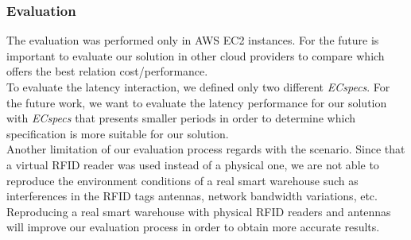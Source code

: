 \subsubsection{Evaluation}
\label{subs:conclusion_eval}
The evaluation was performed only in \gls{AWS} \gls{EC2} instances. For the future is important to
evaluate our solution in other cloud providers to compare which offers the best relation
cost/performance.\\

To evaluate the latency interaction, we defined only two different \textit{ECspecs}. For the future work,
we want to evaluate the latency performance for our solution with \textit{ECspecs} that presents smaller
periods in order to determine which specification is more suitable for our solution.\\

Another limitation of our evaluation process regards with the scenario. Since that a virtual \gls{RFID}
reader was used instead of a physical one, we are not able to reproduce the environment conditions
of a real smart warehouse such as interferences in the \gls{RFID} tags antennas, network bandwidth
variations, etc. Reproducing a real smart warehouse with physical \gls{RFID} readers and antennas
will improve our evaluation process in order to obtain more accurate results.
